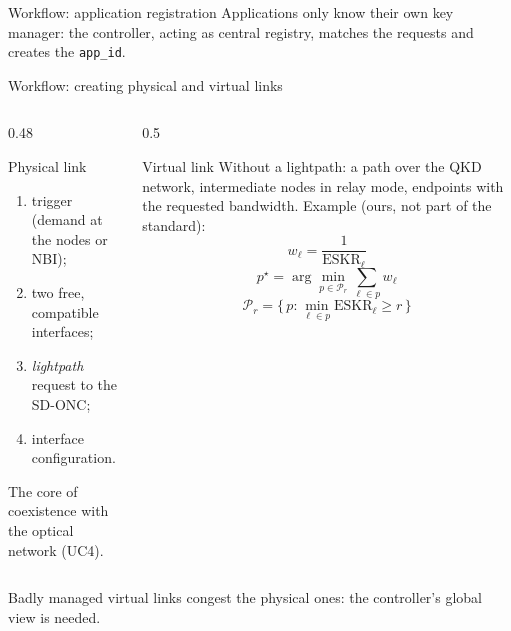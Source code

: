 \documentclass[10pt]{beamer}
\begin{document}
\begin{frame}{Workflow: application registration}
  \small Applications only know their own key manager: the controller,
  acting as \alert{central registry}, matches the requests and creates
  the \texttt{app\_id}.
\end{frame}

\begin{frame}{Workflow: creating physical and virtual links}
  \begin{columns}[T]
    \begin{column}{0.48\textwidth}
      \begin{block}{Physical link}
        \begin{enumerate}\small
          \item trigger (demand at the nodes or NBI);
          \item two free, compatible interfaces;
          \item \emph{lightpath} request to the SD-ONC;
          \item interface configuration.
        \end{enumerate}
        \footnotesize The core of coexistence with the optical network (UC4).
      \end{block}
    \end{column}
    \begin{column}{0.5\textwidth}
      \begin{block}{Virtual link}
        \small Without a lightpath: a path over the QKD network,
        intermediate nodes in relay mode, endpoints with the requested
        bandwidth. Example (ours, not part of the standard):
        \[
          w_\ell = \frac{1}{\mathrm{ESKR}_\ell}
        \]
        \[
          p^\star = \arg\min_{p\in\mathcal{P}_r} \sum_{\ell\in p} w_\ell
        \]
        \[
          \mathcal{P}_r = \Big\{\, p : \min_{\ell\in p}\mathrm{ESKR}_\ell \ge r \,\Big\}
        \]
      \end{block}
    \end{column}
  \end{columns}
  \vspace{1ex}
  \small Badly managed virtual links congest the physical ones: the
  controller's global view is needed.
\end{frame}
\end{document}
